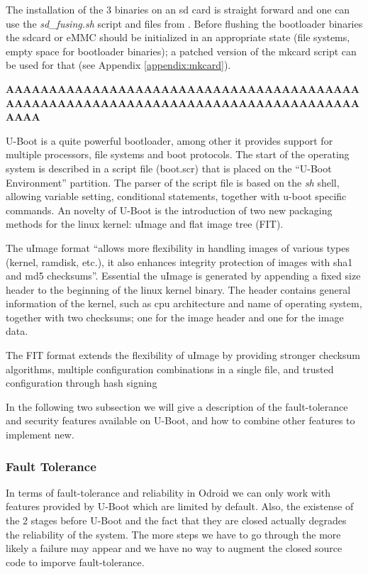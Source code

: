 The installation of the 3 binaries on an sd card is straight forward and one can use the \textit{sd\_fusing.sh} script and files from \cite{sd_fusing}. Before flushing the bootloader binaries the sdcard or eMMC should be initialized in an appropriate state (file systems, empty space for bootloader binaries); a patched version of the mkcard script can be used for that (see Appendix \ref{appendix:mkcard}).

\textbf{AAAAAAAAAAAAAAAAAAAAAAAAAAAAAAAAAAAAAAAAAAAAAAAAAAAAAAAAAAAAAAAAAAAAAAAAAAAAAAAAAAAAAA}

U-Boot is a quite powerful bootloader, among other it provides support for multiple processors, file systems and boot protocols. The start of the operating system is described in a script file (boot.scr) that is placed on the ``U-Boot Environment'' partition. The parser of the script file is based on the \textit{sh} shell, allowing variable setting, conditional statements, together with u-boot specific commands. An novelty of U-Boot is the introduction of two new packaging methods for the linux kernel: uImage and flat image tree (FIT).

The uImage format \cite{uImage-fit} ``allows more flexibility in handling images of various types (kernel, ramdisk, etc.), it also enhances integrity protection of images with sha1 and md5 checksums''. Essential the uImage is generated by appending a fixed size header to the beginning of the linux kernel binary. The header contains general information of the kernel, such as cpu architecture and name of operating system, together with two checksums; one for the image header and one for the image data.

The FIT format \cite{uImage-fit} extends the flexibility of uImage by providing stronger checksum algorithms, multiple configuration combinations in a single file, and trusted configuration through hash signing

In the following two subsection we will give a description of the fault-tolerance and security features available on U-Boot, and how to combine other features to implement new.

\subsubsection{Fault Tolerance}

In terms of fault-tolerance and reliability in Odroid we can only work with features provided by U-Boot which are limited by default. Also, the existense of the 2 stages before U-Boot and the fact that they are closed actually degrades the reliability of the system. The more steps we have to go through the more likely a failure may appear and we have no way to augment the closed source code to imporve fault-tolerance.


